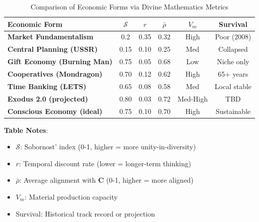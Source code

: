 \documentclass[11pt,a4paper]{article}
\theoremstyle{definition}
\theoremstyle{remark}
\begin{document}
\begin{small}
\begin{enumerate}
\vspace{2em}

\begin{table}[H]
\centering
\caption{Comparison of Economic Forms via Divine Mathematics Metrics}
\label{tab:economic_forms_comparison}
\begin{tabular}{|l|c|c|c|c|c|}
\hline
\textbf{Economic Form} & \(\mathcal{S}\) & \(r\) & \(\bar{\rho}\) & \(V_m\) & \textbf{Survival} \\
\hline
\textbf{Market Fundamentalism} & 0.2 & 0.35 & 0.32 & High & Poor (2008) \\
\hline
\textbf{Central Planning (USSR)} & 0.15 & 0.10 & 0.25 & Med & Collapsed \\
\hline
\textbf{Gift Economy (Burning Man)} & 0.75 & 0.05 & 0.68 & Low & Niche only \\
\hline
\textbf{Cooperatives (Mondragon)} & 0.70 & 0.12 & 0.62 & High & 65+ years \\
\hline
\textbf{Time Banking (LETS)} & 0.65 & 0.08 & 0.58 & Med & Local stable \\
\hline
\textbf{Exodus 2.0 (projected)} & 0.80 & 0.03 & 0.72 & Med-High & TBD \\
\hline
\textbf{Conscious Economy (ideal)} & 0.75 & 0.10 & 0.70 & High & Sustainable \\
\hline
\end{tabular}
\end{table}

\vspace{1em}

\textbf{Table Notes}:
\begin{itemize}[nosep]
    \item \(\mathcal{S}\): Sobornost' index (0-1, higher = more unity-in-diversity)
    \item \(r\): Temporal discount rate (lower = longer-term thinking)
    \item \(\bar{\rho}\): Average alignment with \(\mathbf{C}\) (0-1, higher = more aligned)
    \item \(V_m\): Material production capacity
    \item Survival: Historical track record or projection
\end{itemize}


\end{enumerate}
\end{small}
\end{document}
